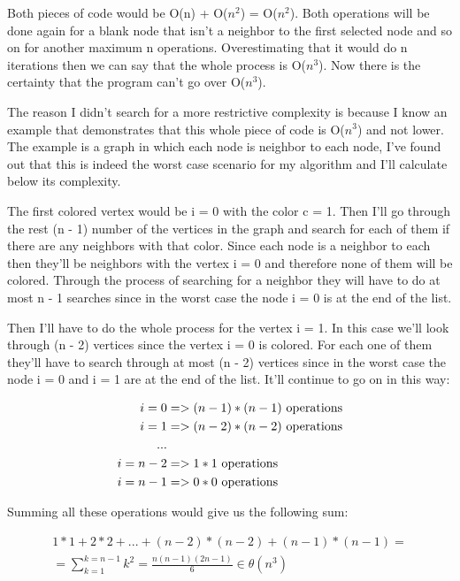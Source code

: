 \documentclass[runningheads]{llncs}
\begin{document}
Both pieces of code would be O(n) + O($n^2$) = O($n^2$). Both operations will be done
again for a blank node that isn't a neighbor to the first selected node and so on
for another maximum n operations. Overestimating that it would do n iterations
then we can say that the whole process is O($n^3$). Now there is the certainty
that the program can't go over O($n^3$). 


The reason I didn't search for a more
restrictive complexity is because I know an example that demonstrates that this
whole piece of code is O($n^3$) and not lower. The example is a graph in which
each node is neighbor to each node, I've found out that this is indeed the worst case
scenario for my algorithm and I'll calculate below its complexity.

The first colored vertex would be i = 0 with the color c = 1. Then I'll go through
the rest (n - 1) number of the vertices in the graph and search for each of them if there are
any neighbors with that color. Since each node is a neighbor to each then they'll
be neighbors with the vertex i = 0 and therefore none of them will be colored. Through the process
of searching for a neighbor they will have to do at most n - 1 searches since in the
worst case the node i = 0 is at the end of the list.

Then I'll have to do the whole process for the vertex i = 1. In this case we'll look
through (n - 2) vertices since the vertex i = 0 is colored. For each one of them they'll
have to search through at most (n - 2) vertices since in the worst case the node i = 0 and i = 1
are at the end of the list. It'll continue to go on in this way:

\begin{align*}
i = 0 &=> (n - 1) * (n - 1) \textnormal{ operations} \\
i = 1 &=> (n - 2) * (n - 2) \textnormal{ operations} \\
... \\
i = n - 2 &=> 1 * 1 \textnormal{ operations} \\
i = n - 1 &=> 0 * 0 \textnormal{ operations} \\
\end{align*}

Summing all these operations would give us the following sum:

\begin{align*}
1 * 1 + 2 * 2 + ... + (n - 2) * (n - 2) + (n - 1) * (n - 1) = \\
= \sum_{k=1}^{k=n-1} k^2 = \frac{n(n - 1)(2n - 1)}{6} \in \theta(n^3) \\
\end{align*}
\end{document}
